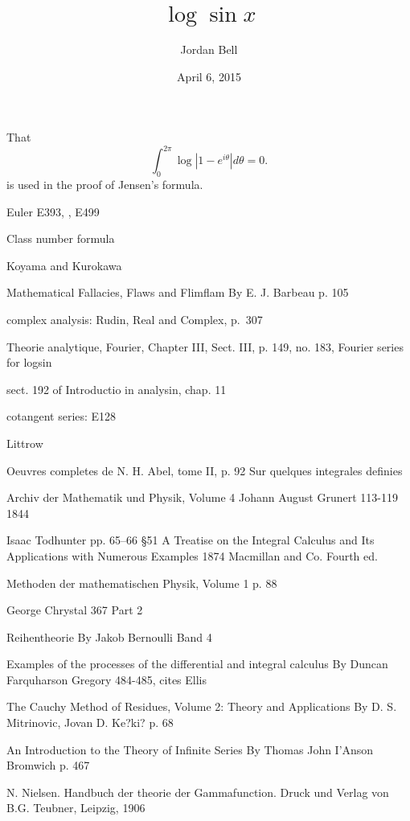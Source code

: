 \documentclass{article}
\begin{document}
\title{$\log\sin x$}
\author{Jordan Bell}
\date{April 6, 2015}

\maketitle

That 
\[
\int_0^{2\pi} \log|1-e^{i\theta}| d\theta = 0.
\]
is used in the proof of Jensen's formula.

Euler \cite[\S\S 35--37]{E393} E393,  \cite[\S 21]{E432}, \cite{E499} E499
 
 Class number formula
 
Koyama and Kurokawa \cite{koyama}

Mathematical Fallacies, Flaws and Flimflam
 By E. J. Barbeau
 p. 105
 
 complex analysis: Rudin, Real and Complex, p.~307
 
 Theorie analytique, Fourier, Chapter III, Sect. III, p. 149, no. 183, Fourier series for logsin
 
 sect. 192 of Introductio in analysin, chap. 11
  
 cotangent series: E128
 
 Littrow 
 
 Oeuvres completes de N. H. Abel, tome II, p. 92
 Sur quelques integrales definies
 
 Archiv der Mathematik und Physik, Volume 4
Johann August Grunert
113-119
1844

Isaac Todhunter
pp. 65--66
\S 51
A Treatise on the Integral Calculus and Its Applications with Numerous Examples
1874
Macmillan and Co.
Fourth ed.

Methoden der mathematischen Physik, Volume 1
p. 88

George Chrystal
367
Part 2

Reihentheorie
 By Jakob Bernoulli
 Band 4
 
 \cite[p.~8]{MR1700272}
 
 Examples of the processes of the differential and integral calculus
 By Duncan Farquharson Gregory
 484-485, cites Ellis
 
 The Cauchy Method of Residues, Volume 2: Theory and Applications
 By D. S. Mitrinovic, Jovan D. Ke?ki?
 p. 68
 
 An Introduction to the Theory of Infinite Series
 By Thomas John I'Anson Bromwich
 p. 467
 
 N. Nielsen. Handbuch der theorie der Gammafunction. Druck und Verlag von B.G. Teubner, Leipzig, 1906
 
\end{document}
